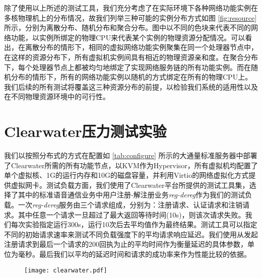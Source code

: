 \begin{figure}[!htp]
	\centering
\end{figure}
除了使用以上所述的测试工具，我们充分考虑了在实际环境下各种网络功能实例在多核物理机上的分布情况，故我们列举三种可能的实例分布方式如图 \ref{fig:resource} 所示，分别为离散分布、随机分布和聚合分布。图中以不同的色块来代表不同的网络功能，以实例所绑定的物理CPU来代表某个实例的物理资源分配情况。可以看出，在离散分布的情形下，相同的虚拟网络功能实例聚集在同一个处理器节点中，在这样的资源分布下，所有虚拟机实例间具有相近的物理资源亲和度。在聚合分布下，每个处理器节点上都被均匀地绑定了实现网络服务链的所有功能实例。而在随机分布的情形下，所有的网络功能实例以随机的方式绑定在所有的物理CPU上。我们后续的所有测试将覆盖这三种资源分布的前提，以检验我们系统的适用性以及在不同物理资源环境中的可行性。


\section{Clearwater压力测试实验}
我们以按照分布式的方式在配置如 \ref{tab:configure} 所示的大通量标准服务器中部署了Clearwater所需的所有功能节点，以KVM作为Hypervisor，所有虚拟机均配置了单个虚拟核、1G的运行内存和10G的磁盘容量，并利用Virtio的网络虚拟化方式提供虚拟网卡。测试负载方面，我们使用了Clearwater平台所提供的测试工具集，选择了其中的标准语音通信业务中用户注册-解注册业务\textit{reg-dereg}作为我们的测试负载。一次\textit{reg-dereg}服务由三个请求组成，分别为：注册请求、认证请求和注销请求。其中任意一个请求一旦超过了最大返回等待时间(10s)，则该次请求失败。我们每次实验指定运行300s，运行10次后去平均值作为最终结果。测试工具可以指定不同的初始请求速率来测试不同负载强度下的平均请求响应延迟。我们使用从发起注册请求到最后一个请求的200回执为止的平均时间作为衡量延迟的具体参数，单位为毫秒。最后我们以平均的延迟时间和请求的成功率来作为性能比较的依据。

\begin{figure}[htp]
	\centering
	\texttt{[image: clearwater.pdf]}
\end{figure}

